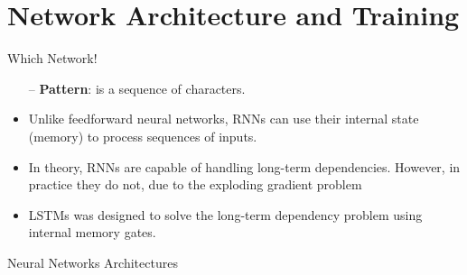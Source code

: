 \section{Network Architecture and Training}

\begin{frame}[fragile]{Which Network!}


		\begin{itemize}
			\item[--] \textbf{Pattern}: is a sequence of characters.
			\item  Unlike feedforward neural networks, RNNs can use their internal state (memory) to process sequences of inputs.
			\item In theory, RNNs are capable of handling long-term dependencies. 	However, in practice they do not, due to the \alert{exploding gradient problem}
			\item LSTMs was designed to solve the long-term dependency problem using internal memory gates.
		\end{itemize}
		
\end{frame}
\begin{frame}[fragile]{Neural Networks Architectures}


\end{frame}

